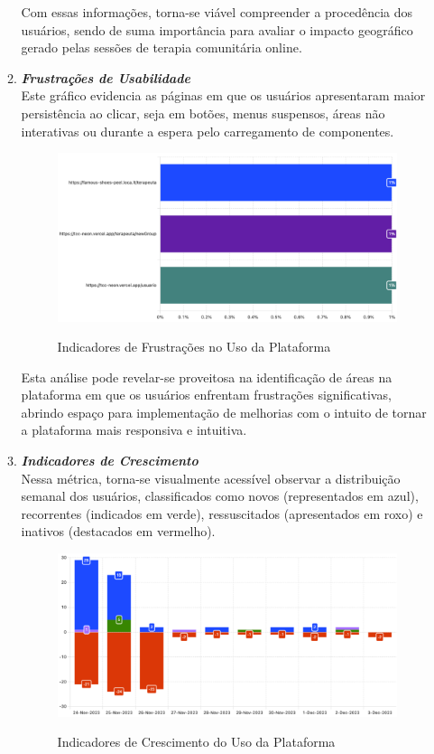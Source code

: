 \begin{enumerate}
\begin{enumerate}
Com essas informações, torna-se viável compreender a procedência dos usuários, sendo de suma importância para avaliar o impacto geográfico gerado pelas sessões de terapia comunitária online.

\item\textit{\textbf{Frustrações de Usabilidade}}\\
Este gráfico evidencia as páginas em que os usuários apresentaram maior persistência ao clicar, seja em botões, menus suspensos, áreas não interativas ou durante a espera pelo carregamento de componentes.

\begin{figure}[!ht]
    \centering
    \includegraphics[scale=0.4]{latex/figuras/clique.pdf}
    \label{clique}
    \caption[Frustrações de Usabilidade]{Indicadores de Frustrações no Uso da Plataforma}
    \label{fig:enter-label}
\end{figure}

Esta análise pode revelar-se proveitosa na identificação de áreas na plataforma em que os usuários enfrentam frustrações significativas, abrindo espaço para implementação de melhorias com o intuito de tornar a plataforma mais responsiva e intuitiva.
 
\item\textit{\textbf{Indicadores de Crescimento}}\\
Nessa métrica, torna-se visualmente acessível observar a distribuição semanal dos usuários, classificados como novos (representados em azul), recorrentes (indicados em verde), ressuscitados (apresentados em roxo) e inativos (destacados em vermelho).

\begin{figure}[!ht]
    \centering
    \includegraphics[scale=0.4]{latex/figuras/cresce.pdf}
    \label{cresce}
    \caption[Indicadores de Crescimento]{Indicadores de Crescimento do Uso da Plataforma}
    \label{fig:enter-label}
\end{figure}
 

\end{enumerate}
\end{enumerate}
